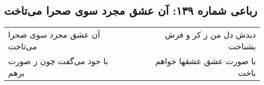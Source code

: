 \begin{center}
\section*{رباعی شماره ۱۳۹: آن عشق مجرد سوی صحرا می‌تاخت}
\label{sec:0139}
\begin{longtable}{l p{0.5cm} r}
آن عشق مجرد سوی صحرا می‌تاخت
&&
دیدش دل من ز کر و فرش بشناخت
\\
با خود می‌گفت چون ز صورت برهم
&&
با صورت عشق عشقها خواهم باخت
\\
\end{longtable}
\end{center}
